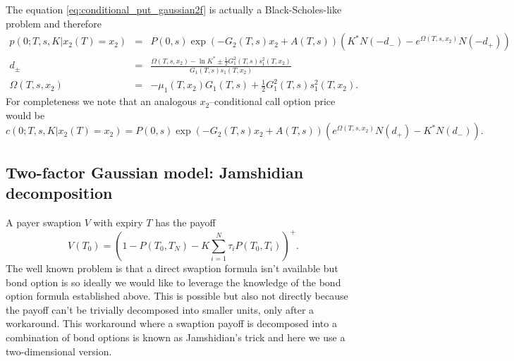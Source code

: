 \documentclass[11pt,a4paper]{article}
\numberwithin{equation}{section}
\begin{document}
The equation \eqref{eq:conditional_put_gaussian2f} is actually a Black-Scholes-like problem and therefore
\begin{eqnarray*}
p(0;T,s,K|{x_2}(T) = {x_2}) &=& P(0,s)\exp \left( { - {G_2}(T,s){x_2} + A(T,s)} \right)\left( {{K^*}N( - {d_ - }) - {e^{\Omega (T,s,{x_2})}}N( - {d_ + })} \right)\\
{d_ \pm } &=& \frac{{\Omega (T,s,{x_2}) - \ln {K^*} \pm \frac{1}{2}G_1^2(T,s)s_1^2(T,{x_2})}}{{{G_1}(T,s){s_1}(T,{x_2})}}\\
\Omega (T,s,{x_2}) &=&  - {\mu _1}(T,{x_2}){G_1}(T,s) + \frac{1}{2}G_1^2(T,s)s_1^2(T,{x_2}).
\end{eqnarray*}
For completeness we note that an analogous $x_2$--conditional call option price would be
\begin{equation*}
  c(0;T,s,K|{x_2}(T) = {x_2}) = P(0,s)\exp \left( { - {G_2}(T,s){x_2} + A(T,s)} \right)\left( {{e^{\Omega (T,s,{x_2})}}N({d_ + }) - {K^*}N({d_ - })} \right).
\end{equation*}
\subsection{Two-factor Gaussian model: Jamshidian decomposition}
A payer swaption $V$ with expiry $T$ has the payoff 
\begin{equation*}
  V({T_0}) = {\left( {1 - P({T_0},{T_N}) - K\sum\limits_{i = 1}^N {{\tau _i}P({T_0},{T_i})} } \right)^ + }.
\end{equation*}
The well known problem is that a direct swaption formula isn't available but bond option is so ideally we would like to leverage the knowledge of the bond option formula established above. This is possible but also not directly because the payoff can't be trivially decomposed into smaller units, only after a workaround. This workaround where a swaption payoff is decomposed into a combination of bond options is known as Jamshidian's trick and here we use a two-dimensional version.
\end{document}
